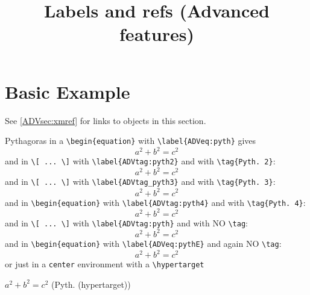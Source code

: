 \documentclass[landscape]{ximera}
\title{Labels and refs (Advanced features)}
\begin{document}
\begin{abstract}
\end{abstract}
\maketitle
\label{xim:labelsAdvanced}



\section{Basic Example}
\label{ADVsec:basic example}
See \autoref{ADVsec:xmref} for links to objects in this section.


Pythagoras in a \verb|\begin{equation}| with \verb|\label{ADVeq:pyth}| gives
\begin{equation}
  a^2 + b^2 = c^2   \label{ADVeq:pyth}
\end{equation}
and in \verb|\[ ... \]| with \verb|\label{ADVtag:pyth2}| and with \verb|\tag{Pyth. 2}|:
\[
  a^2 + b^2 = c^2   \label{ADVtag:pyth2} \tag{Pyth. 2}
\]
and in \verb|\[ ... \]| with \verb|\label{ADVtag_pyth3}| and with \verb|\tag{Pyth. 3}|:
\[
  a^2 + b^2 = c^2   \label{ADVtag_pyth3} \tag{Pyth. 3} 
\]
and in \verb|\begin{equation}| with \verb|\label{ADVtag:pyth4}| and with \verb|\tag{Pyth. 4}|:
\begin{equation}
  a^2 + b^2 = c^2   \label{ADVtag:pyth4} \tag{Pyth. 4} 
\end{equation}
and in \verb|\[ ... \]| with \verb|\label{ADVtag:pyth}| and with NO \verb|\tag|:
\[
  a^2 + b^2 = c^2  \label{ADVtag:pyth}
\]
and in \verb|\begin{equation}| with \verb|\label{ADVeq:pythE}| and again NO \verb|\tag|:
\begin{equation}
  a^2 + b^2 = c^2  \label{ADVeq:pythE} 
\end{equation}
or just in a \verb|center| environment with a \verb|\hypertarget|
\begin{center}
 \hfill\qquad $a^2 + b^2 = c^2$  \qquad \hfill  \hypertarget{ht:pyth}{(Pyth. (hypertarget))}
\end{center}
\end{document}
